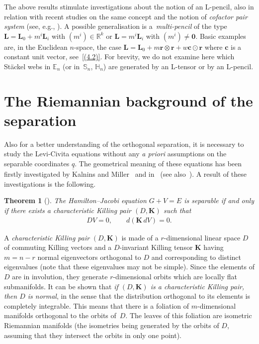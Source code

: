 \documentclass[pdftex]{sigma}
\def\bs{\boldsymbol}
\numberwithin{equation}{section}
\newtheorem{Theorem}{Theorem}[section]
 { \theoremstyle{definition}
\newtheorem{Notation}[Theorem]{Notation}
\newtheorem{Example}[Theorem]{Example}
\newtheorem{Remark}[Theorem]{Remark}
\newtheorem{Remarks}[Theorem]{Remarks}
 }
\begin{document}
The above results stimulate investigations about the notion of an L-pencil, also in relation with recent studies on the same concept and the notion of {\it cofactor pair system} (see, e.g., \cite{Lundmark-2001, Marciniak-Blaszak-2002, Rauch-Wojciechowski-Marciniak-Lundmark-1999,
Rauch-Wojciechowski-Waksjo-2003}). A possible generalisation is a~{\it multi-pencil} of the type $\bs L=\bs L_0+m^i\bs L_i$ with $(m^i)\in \mathbb R^k$ or $\bs L=m^i\bs L_i$ with $(m^i)\neq \bs 0$. Basic examples are, in the Euclidean $n$-space, the case $\bs L=\bs L_0+ m  \bs r\otimes\bs r+ w \bs c\odot \bs r$ where $\bs c$ is a constant unit vector, see~\eqref{(4.2)}.
For brevity, we do not examine here which St\"ackel webs in $\mathbb E_n$ (or in~$\mathbb S_n$, $\mathbb H_n$) are generated by an L-tensor or by an L-pencil.



\section{The Riemannian background of the separation}\label{section12}

Also for a better understanding of the orthogonal separation, it is necessary to study the Levi-Civita equations without any {\it a priori} assumptions on the separable coordinates $\underline q$. The geometrical meaning of these equations has been f\/irstly investigated by Kalnins and Miller~\cite{KM-1980,KM-1981} and in~\cite{Benenti-1980} (see also~\cite{Benenti-1991,Benenti-1996}). A result of these investigations is the following.

\begin{Theorem}[\cite{Benenti-1997}]\label{t:12.1}
The Hamilton--Jacobi equation $G+V=E$ is separable if and only if there exists a characteristic Killing pair $(D,\bs K)$ such that
\begin{gather}
DV=0, \qquad d(\bs K \,dV)=0.
\label{(12.1)}
\end{gather}
\end{Theorem}

A {\it characteristic Killing pair} $(D,\bs K)$ is made of a $r$-dimensional linear space $D$ of commuting Killing vectors and a $D$-invariant Killing tensor $\bs K$ having $m=n-r$ normal eigenvectors orthogonal to $D$ and corresponding to distinct eigenvalues (note that these eigenvalues may not be simple). Since the elements of $D$ are in involution, they generate $r$-dimensional orbits which are locally f\/lat submanifolds. It can be shown that {\it if $(D,\bs K)$ is a characteristic Killing pair, then $D$ is normal}, in the sense that the distribution orthogonal to its elements is completely integrable. This means that there is a foliation of $m$-dimensional manifolds orthogonal to the orbits of~$D$. The leaves of this foliation are isometric Riemannian manifolds (the isometries being generated by the orbits of $D$, assuming that they intersect the orbits in only one point).
\end{document}
